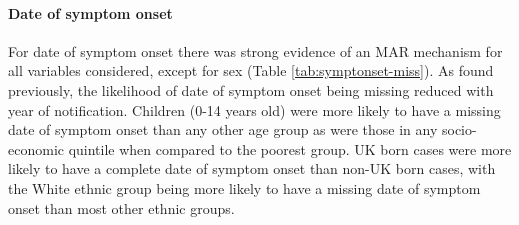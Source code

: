\documentclass[11pt,twoside]{bristolthesis}
\begin{document}
  \hypertarget{date-of-symptom-onset}{%
  \paragraph{Date of symptom onset}\label{date-of-symptom-onset}}
  
  For date of symptom onset there was strong evidence of an MAR mechanism for all variables considered, except for sex (Table \ref{tab:symptonset-miss}). As found previously, the likelihood of date of symptom onset being missing reduced with year of notification. Children (0-14 years old) were more likely to have a missing date of symptom onset than any other age group as were those in any socio-economic quintile when compared to the poorest group. UK born cases were more likely to have a complete date of symptom onset than non-UK born cases, with the White ethnic group being more likely to have a missing date of symptom onset than most other ethnic groups.
  
\end{document}
